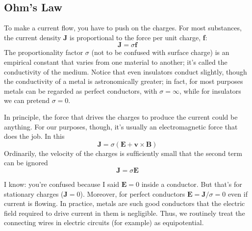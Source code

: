 \documentclass[../../../main.tex]{subfiles}
\begin{document}
\subsection{Ohm's Law}
To make a current ﬂow, you have to push on the charges. For most substances, the current density \textbf{J} is proportional to the force per unit charge, \textbf{f}:
\begin{equation*}
    \mathbf{J} = \sigma \mathbf{f}
\end{equation*}
The proportionality factor $\sigma$ (not to be confused with surface charge) is an empirical constant that varies from one material to another; it's called the conductivity of the medium.  Notice that even insulators conduct slightly, though the conductivity of a metal is astronomically greater; in fact, for most purposes metals can be regarded as perfect conductors, with $\sigma = \infty$, while for insulators
we can pretend $\sigma = 0$.

In principle, the force that drives the charges to produce the current could be anything. For our purposes, though, it's usually an electromagnetic force that does the job. In this
\begin{equation*}
    \mathbf{J} = \sigma(\mathbf{E}+\mathbf{v}\times \mathbf{B})
\end{equation*}
Ordinarily, the velocity of the charges is sufﬁciently small that the second term can be ignored
\begin{equation*}
    \mathbf{J} = \sigma\mathbf{E}
\end{equation*}

I know: you're confused because I said $\mathbf{E} = 0$ inside a conductor. But that's for stationary charges ($\mathbf{J} = 0$). Moreover, for perfect conductors $\mathbf{E} = \mathbf{J}/\sigma = 0$ even if current is ﬂowing. In practice, metals are such good conductors that the electric ﬁeld required to drive current in them is negligible. Thus, we routinely treat the connecting wires in electric circuits (for example) as equipotential.
\end{document}
